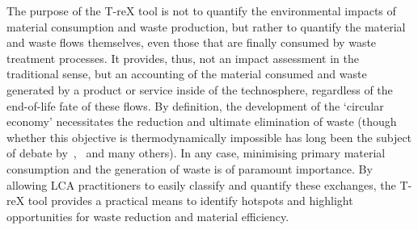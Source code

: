 

The purpose of the T-reX tool is not to quantify the environmental impacts of material consumption and waste production, but rather to quantify the material and waste flows themselves, even those that are finally consumed by waste treatment processes. It provides, thus, not an impact assessment in the traditional sense, but an accounting of the material consumed and waste generated by a product or service inside of the technosphere, regardless of the end-of-life fate of these flows. By definition, the development of the `circular economy' necessitates the reduction and ultimate elimination of waste (though whether this objective is thermodynamically impossible has long been the subject of debate by~\cite{ayres1998recycling},~\cite{reuter2012recyclinglimits} and many others). In any case, minimising primary material consumption and the generation of waste is of paramount importance. By allowing LCA practitioners to easily classify and quantify these exchanges, the T-reX tool provides a practical means to identify hotspots and highlight opportunities for waste reduction and material efficiency.




